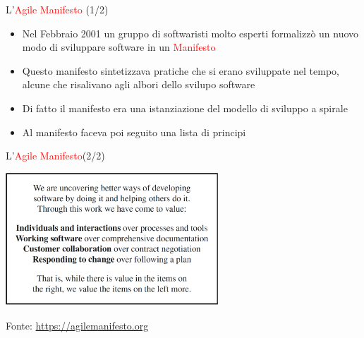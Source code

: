 \documentclass{beamer}
\begin{document}
\begin{frame}{\centerline{L'\textcolor{red}{Agile Manifesto} (1/2)}}
\begin{itemize}
    \item Nel Febbraio 2001 un gruppo di softwaristi molto esperti formalizz\`{o} un nuovo modo di sviluppare software in un \textcolor{red}{Manifesto}
    \item Questo manifesto sintetizzava pratiche che si erano sviluppate nel tempo, alcune che risalivano agli albori dello svilupo software
    \item Di fatto il manifesto era una istanziazione del modello di sviluppo a spirale
    \item Al manifesto faceva poi seguito una lista di principi
\end{itemize}
\end{frame}


\begin{frame}{\centerline{L'\textcolor{red}{Agile Manifesto}(2/2)}}

\begin{center}
\includegraphics[width=80mm]{P2023.AIBCCSS.IlConcettoDiSoftware/img-img00.png}
\end{center}
\begin{center}
\tiny
Fonte: \url{https://agilemanifesto.org}
\end{center}

\end{frame}
\end{document}
